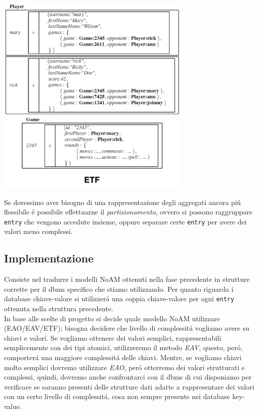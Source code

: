 \includegraphics[width=0.7\textwidth]{img/etf}

Se dovessimo aver bisogno di una rappresentazione degli aggregati ancora piú flessibile é possibile effettuarne il \emph{partizionamento},
ovvero si possono raggruppare \texttt{entry} che vengono accedute insieme, oppure separare certe \texttt{entry} per avere dei
valori meno complessi.

\subsection{Implementazione}
Consiste nel tradurre i modelli NoAM ottenuti nella fase precedente in strutture corrette per il dbms specifico che stiamo utilizzando.
Per quanto riguarda i database chiave-valore si utilizzerá una coppia chiave-valore per ogni \texttt{entry} ottenuta nella struttura
precedente.\\
In base alle scelte di progetto si decide quale modello NoAM utilizzare (EAO/EAV/ETF); bisogna decidere che livello di
complessitá vogliamo avere su chiavi e valori.
Se vogliamo ottenere dei valori semplici, rappresentabili semplicemente con dei tipi atomici, utilizzeremo il metodo \emph{EAV}, questo, peró, comporterá una maggiore complessitá delle chiavi.
Mentre, se vogliamo chiavi molto semplici dovremo utilizzare \emph{EAO}, peró otterremo dei valori strutturati e complessi, quindi, dovremo anche confrontarci con
il dbms di cui disponiamo per verificare se saranno presenti delle strutture dati adatte a rappresentare dei valori con un certo livello di complessitá, cosa non sempre
presente nei database key-value.\\

